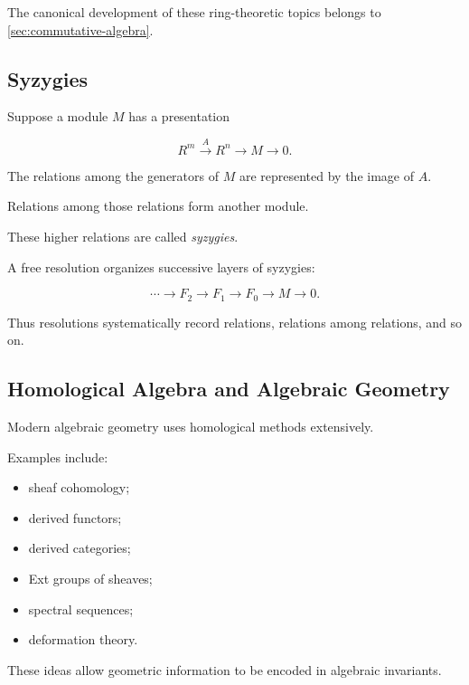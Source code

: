 The canonical development of these ring-theoretic topics belongs to
\cref{sec:commutative-algebra}.

\subsection{Syzygies}
\label{subsec:syzygies-homological}

Suppose a module \(M\) has a presentation

\[ R^m\xrightarrow{A}R^n\to M\to0. \]

The relations among the generators of \(M\) are represented by the image of
\(A\).

Relations among those relations form another module.

These higher relations are called \emph{syzygies}.

A free resolution organizes successive layers of syzygies:

\[ \cdots\to F_2\to F_1\to F_0\to M\to0. \]

Thus resolutions systematically record relations, relations among relations,
and so on.

\subsection{Homological Algebra and Algebraic Geometry}
\label{subsec:homological-algebraic-geometry}

Modern algebraic geometry uses homological methods extensively.

Examples include:

\begin{itemize}
    \item sheaf cohomology;
    \item derived functors;
    \item derived categories;
    \item Ext groups of sheaves;
    \item spectral sequences;
    \item deformation theory.
\end{itemize}

These ideas allow geometric information to be encoded in algebraic
invariants.

